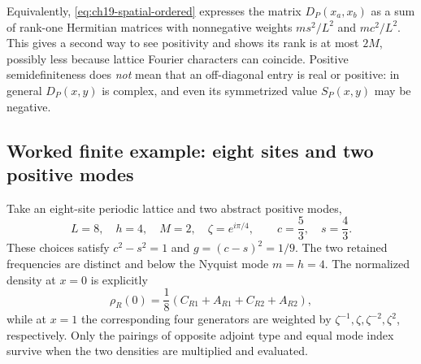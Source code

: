 Equivalently, \eqref{eq:ch19-spatial-ordered} expresses the matrix
$D_P(x_a,x_b)$ as a sum of rank-one Hermitian matrices with
nonnegative weights $ms^2/L^2$ and $mc^2/L^2$.  This gives a second
way to see positivity and shows its rank is at most $2M$, possibly
less because lattice Fourier characters can coincide.  Positive
semidefiniteness does \emph{not} mean that an off-diagonal entry is
real or positive: in general $D_P(x,y)$ is complex, and even its
symmetrized value $S_P(x,y)$ may be negative.

\subsection{Worked finite example: eight sites and two positive modes}

Take an eight-site periodic lattice and two abstract positive modes,
\begin{equation}
 L=8,\quad h=4,\quad M=2,\quad
 \zeta=e^{i\pi/4},\qquad c=\frac53,\quad s=\frac43.
 \label{eq:ch19-spatial-example-data}
\end{equation}
These choices satisfy $c^2-s^2=1$ and
$g=(c-s)^2=1/9$.  The two retained frequencies are distinct and
below the Nyquist mode $m=h=4$.  The normalized density at $x=0$
is explicitly
\[
 \rho_R(0)=\frac18(C_{R1}+A_{R1}+C_{R2}+A_{R2}),
\]
while at $x=1$ the corresponding four generators are weighted by
$\zeta^{-1},\zeta,\zeta^{-2},\zeta^2$, respectively.  Only the
pairings of opposite adjoint type and equal mode index survive when
the two densities are multiplied and evaluated.

